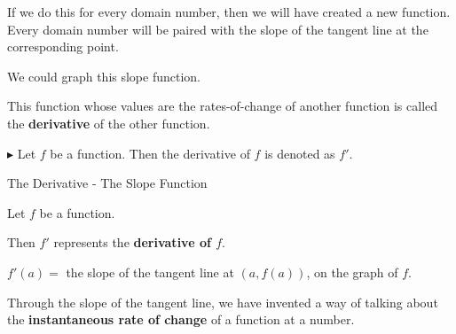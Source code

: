 \documentclass{ximera}
\begin{document}
If we do this for every domain number, then we will have created a new function.  Every domain number will be paired with the slope of the tangent line at the corresponding point.

We could graph this slope function.







\begin{center}
\end{center}




This function whose values are the rates-of-change of another function is called the \textbf{derivative} of the other function.




$\blacktriangleright$ Let $f$ be a function.  Then the derivative of $f$ is denoted as $f'$.



\begin{definition} The Derivative - The Slope Function

Let $f$ be a function.

Then $f'$ represents the \textbf{derivative of $f$}.


$f'(a) = $ the slope of the tangent line at $(a, f(a))$, on the graph of $f$.




\end{definition}



Through the slope of the tangent line, we have invented a way of talking about the \textbf{instantaneous rate of change} of a function at a number. \\
\end{document}

